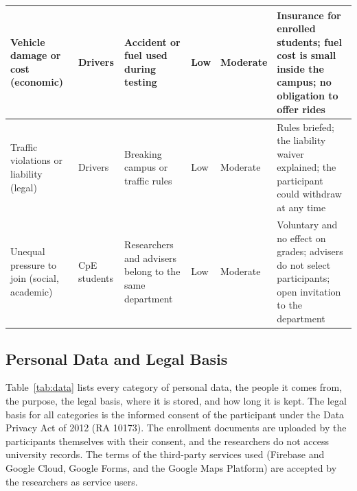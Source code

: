 \begin{footnotesize}
\begin{longtable}{p{}p{}p{}p{}p{}p{}}
Vehicle damage or cost (economic) & Drivers & Accident or fuel used during testing & Low & Moderate & Insurance for enrolled students; fuel cost is small inside the campus; no obligation to offer rides \\ \hline
Traffic violations or liability (legal) & Drivers & Breaking campus or traffic rules & Low & Moderate & Rules briefed; the liability waiver explained; the participant could withdraw at any time \\ \hline
Unequal pressure to join (social, academic) & CpE students & Researchers and advisers belong to the same department & Low & Moderate & Voluntary and no effect on grades; advisers do not select participants; open invitation to the department \\ \hline
\end{longtable}
\end{footnotesize}

\subsection[Personal Data and Legal Basis]{Personal Data and Legal Basis}\label{sec:legal}
Table~\ref{tab:data} lists every category of personal data, the people it comes from, the purpose, the legal basis, where it is stored, and how long it is kept. The legal basis for all categories is the informed consent of the participant under the Data Privacy Act of 2012 (RA 10173). The enrollment documents are uploaded by the participants themselves with their consent, and the researchers do not access university records. The terms of the third-party services used (Firebase and Google Cloud, Google Forms, and the Google Maps Platform) are accepted by the researchers as service users.

